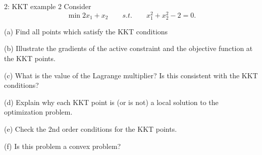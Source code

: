 
\begin{problem}{2: KKT example 2}
Consider
\[
  \min 2x_1 + x_2 \qquad s.t. \qquad x_1^2 + x_2^2 - 2 = 0
.\] 

(a) Find all points which satisfy the KKT conditions

\medskip

(b) Illustrate the gradients of the active constraint and the objective function at the KKT points.

\medskip

(c) What is the value of the Lagrange multiplier? Is this consistent with the KKT conditions?

\medskip

(d) Explain why each KKT point is (or is not) a local solution to the optimization problem.

\medskip

(e) Check the 2nd order conditions for the KKT points. 

\medskip

(f) Is this problem a convex problem?

\end{problem}


